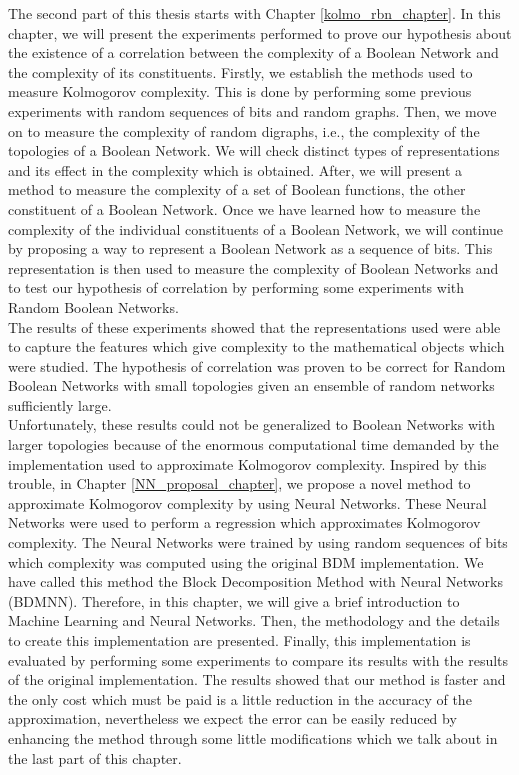 The second part of this thesis starts with Chapter \ref{kolmo_rbn_chapter}. In this chapter, we will present the experiments performed to prove our hypothesis about the existence of a correlation between the complexity of a Boolean Network and the complexity of its constituents. Firstly, we establish the methods used to measure Kolmogorov complexity. This is done by performing some previous experiments with random sequences of bits and random graphs. Then, we move on to measure the complexity of random digraphs, i.e., the complexity of the topologies of a Boolean Network. We will check distinct types of representations and its effect in the complexity which is obtained. After, we will present a method to measure the complexity of a set of Boolean functions, the other constituent of a Boolean Network. Once we have learned how to measure the complexity of the individual constituents of a Boolean Network, we will continue by proposing a way to represent a Boolean Network as a sequence of bits. This representation is then used to measure the complexity of Boolean Networks and to test our hypothesis of correlation by performing some experiments with Random Boolean Networks.\\

The results of these experiments showed that the representations used were able to capture the features which give complexity to the mathematical objects which were studied. The hypothesis of correlation was proven to be correct for Random Boolean Networks with small topologies given an ensemble of random networks sufficiently large.\\

Unfortunately, these results could not be generalized to Boolean Networks with larger topologies because of the enormous computational time demanded by the implementation used to approximate Kolmogorov complexity. Inspired by this trouble, in Chapter \ref{NN_proposal_chapter}, we propose a novel method to approximate Kolmogorov complexity by using Neural Networks. These Neural Networks were used to perform a regression which approximates Kolmogorov complexity. The Neural Networks were trained by using random sequences of bits which complexity was computed using the original BDM implementation. We have called this method the Block Decomposition Method with Neural Networks (BDMNN). Therefore, in this chapter, we will give a brief introduction to Machine Learning and Neural Networks. Then, the methodology and the details to create this implementation are presented. Finally, this implementation is evaluated by performing some experiments to compare its results with the results of the original implementation. The results showed that our method is faster and the only cost which must be paid is a little reduction in the accuracy of the approximation, nevertheless we expect the error can be easily reduced by enhancing the method through some little modifications which we talk about in the last part of this chapter.\\

